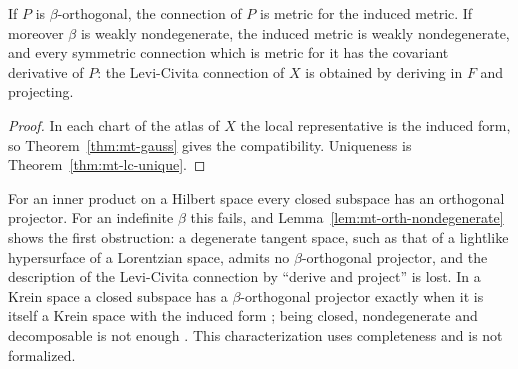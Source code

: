\begin{theorem}
  \label{thm:mt-submanifold-levi-civita}
  \leanok
  If $P$ is $\beta$-orthogonal, the connection of $P$ is metric for the induced metric. If
  moreover $\beta$ is weakly nondegenerate, the induced metric is weakly nondegenerate, and every
  symmetric connection which is metric for it has the covariant derivative of $P$: the
  Levi-Civita connection of $X$ is obtained by deriving in $F$ and projecting.
\end{theorem}

\begin{proof}
  \leanok
  In each chart of the atlas of $X$ the local representative is the induced form, so
  Theorem~\ref{thm:mt-gauss} gives the compatibility. Uniqueness is
  Theorem~\ref{thm:mt-lc-unique}.
\end{proof}

\begin{remark}
  For an inner product on a Hilbert space every closed subspace has an orthogonal projector. For
  an indefinite $\beta$ this fails, and Lemma~\ref{lem:mt-orth-nondegenerate} shows the first
  obstruction: a degenerate tangent space, such as that of a lightlike hypersurface of a
  Lorentzian space, admits no $\beta$-orthogonal projector, and the description of the
  Levi-Civita connection by ``derive and project'' is lost. In a Krein space a closed subspace
  has a $\beta$-orthogonal projector exactly when it is itself a Krein space with the induced form
  \cite[Theorem~V.3.4]{Bog74}; being closed, nondegenerate and decomposable is not enough
  \cite[Example~V.3.3]{Bog74}. This characterization uses completeness and is not formalized.
\end{remark}
